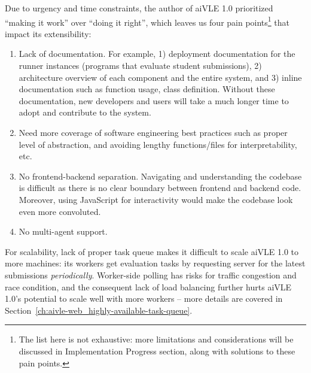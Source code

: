 Due to urgency and time constraints, the author of aiVLE 1.0 prioritized “making it work” over “doing it right”, which leaves us four pain points\footnote{The list here is not exhaustive: more limitations and considerations will be discussed in Implementation Progress section, along with solutions to these pain points.} that impact its extensibility:

\begin{enumerate}
    \item Lack of documentation. For example, 1) deployment documentation for the runner instances (programs that evaluate student submissions), 2) architecture overview of each component and the entire system, and 3) inline documentation such as function usage, class definition. Without these documentation, new developers and users will take a much longer time to adopt and contribute to the system. 
    \item Need more coverage of software engineering best practices such as proper level of abstraction, and avoiding lengthy functions/files for interpretability, etc.
    \item No frontend-backend separation. Navigating and understanding the codebase is difficult as there is no clear boundary between frontend and backend code. Moreover, using JavaScript for interactivity would make the codebase look even more convoluted.
    \item No multi-agent support.
\end{enumerate}

For scalability, lack of proper task queue makes it difficult to scale aiVLE 1.0 to more machines: its workers get evaluation tasks by requesting server for the latest submissions \textit{periodically}. Worker-side polling has risks for traffic congestion and race condition, and the consequent lack of load balancing further hurts aiVLE 1.0’s potential to scale well with more workers – more details are covered in Section~\ref{ch:aivle-web_highly-available-task-queue}.